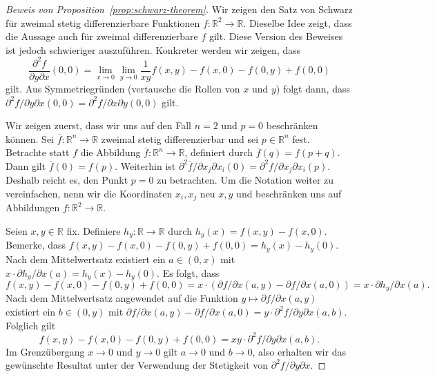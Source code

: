\documentclass[../main.tex]{subfiles}
\begin{document}
\begin{proof}[Beweis von Proposition~\ref{prop:schwarz-theorem}]
  Wir zeigen den Satz von Schwarz für zweimal stetig differenzierbare
  Funktionen $f \colon \mathbb{R}^2 \to \mathbb{R}$.
  Dieselbe Idee zeigt, dass die Aussage auch für
  zweimal differenzierbare $f$ gilt. Diese Version des Beweises
  ist jedoch schwieriger auszuführen.
  Konkreter werden wir zeigen, dass
  \[
    \frac{\partial^2 f}{\partial y \partial x}(0, 0)
    =
    \lim_{x \to 0} \lim_{y \to 0} \frac{1}{xy}
    f(x, y) - f(x, 0) - f(0, y) + f(0, 0)
  \]
  gilt. Aus Symmetriegründen (vertausche die Rollen von $x$ und $y$)
  folgt dann, dass $\partial^2 f/ \partial y \partial x (0, 0)
  = \partial^2 f / \partial x \partial y (0, 0)$ gilt.

  Wir zeigen zuerst, dass wir uns auf den Fall $n = 2$
  und $p = 0$
  beschränken können. Sei $\overline f \colon \mathbb{R}^n \to \mathbb{R}$
  zweimal stetig differenzierbar und sei $p \in \mathbb{R}^n$ fest.
  Betrachte statt $f$ die Abbildung
  $\overline f \colon \mathbb{R}^n \to \mathbb{R}$,
  definiert durch $\overline f(q) = f(p + q)$.
  Dann gilt $\overline f ( 0) = f(p)$.
  Weiterhin ist $\partial^2 \overline f / \partial x_j \partial x_i (0)
  = \partial^2 f / \partial x_j \partial x_i (p)$.
  Deshalb reicht es, den Punkt $p = 0$ zu betrachten.
  Um die Notation weiter zu vereinfachen, nenn wir die Koordinaten
  $x_i, x_j$ neu $x, y$ und beschränken uns auf Abbildungen
  $f \colon \mathbb{R}^2 \to \mathbb{R}$.

  Seien $x, y \in \mathbb{R}$ fix.
  Definiere $h_y \colon \mathbb{R} \to \mathbb{R}$ durch
  $h_y(x) = f(x, y) - f(x, 0)$.
  Bemerke, dass
  $f(x, y) - f(x, 0) - f(0, y) + f(0, 0) = h_y(x) - h_y(0)$.
  Nach dem Mittelwertsatz existiert
  ein $a \in (0, x)$ mit $x \cdot \partial h_y / \partial x (a)
  = h_y(x) - h_y(0)$.
  Es folgt, dass
  \[
    f(x, y) - f(x, 0) - f(0, y) + f(0, 0) = x \cdot
    (\partial f/ \partial x ( a, y) - \partial f/ \partial x (a, 0))
    = x \cdot \partial h_y / \partial x (a).
  \]
  Nach dem Mittelwertsatz angewendet auf die Funktion
  $y \mapsto \partial f / \partial x (a, y)$
  existiert ein $b \in (0, y)$ mit
  $\partial f / \partial x (a, y) - \partial f/ \partial x (a, 0) =
  y \cdot
  \partial^2 f/ \partial y \partial x (a, b)$.
  Folglich gilt
   \[
     f(x, y) - f(x, 0) - f(0, y) + f(0, 0) = xy \cdot \partial^2 f /
     \partial y \partial x (a, b).
  \]
  Im Grenzübergang  $x \to 0$ und $y \to 0$ gilt
  $a \to 0$ und $b \to 0$, also erhalten wir
  das gewünschte Resultat
  unter der Verwendung der Stetigkeit von
  $\partial^2 f / \partial y \partial x$.
\end{proof}
\end{document}
